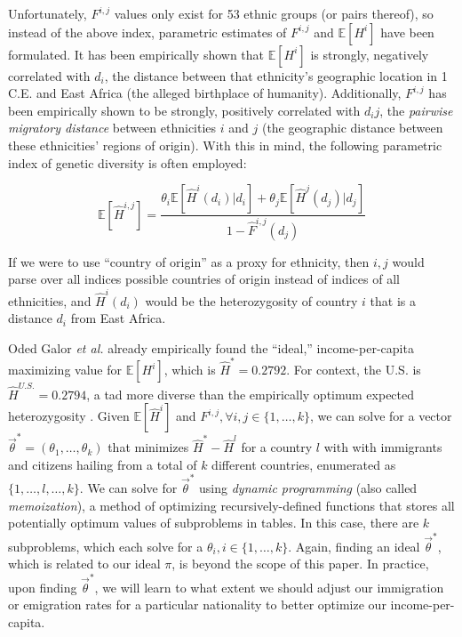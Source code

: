 \documentclass{article}
\begin{document}
Unfortunately, $F^{i,j}$ values only exist for 53 ethnic groups (or pairs thereof), so instead of the above index, parametric estimates of $F^{i,j}$ and $\mathbb{E}[H^i]$ have been formulated. It has been empirically shown that $\mathbb{E}[H^i]$ is strongly, negatively correlated with $d_i$, the distance between that ethnicity's geographic location in 1 C.E. and East Africa (the alleged birthplace of humanity). Additionally, $F^{i,j}$ has been empirically shown to be strongly, positively correlated with $d_ij$, the \textit{pairwise migratory distance} between ethnicities $i$ and $j$ (the geographic distance between these ethnicities' regions of origin). With this in mind, the following parametric index of genetic diversity is often employed:

\[
\mathbb{E}[\hat{H}^{i,j}] = \frac{\theta_i\mathbb{E}[\hat{H}^i(d_i)|d_i] + \theta_j\mathbb{E}[\hat{H}^j(d_j)|d_j]}{1-\hat{F}^{i,j}(d_j)}
\]

If we were to use ``country of origin'' as a proxy for ethnicity, then $i,j$ would parse over all indices possible countries of origin instead of indices of all ethnicities, and $\hat{H}^i(d_i)$ would be the heterozygosity of country $i$ that is a distance $d_i$ from East Africa.

Oded Galor \textit{et al.} \cite{OdedSlides} already empirically found the ``ideal,'' income-per-capita maximizing value for $\mathbb{E}[H^i]$, which is $\hat{H}^* = 0.2792$. For context, the U.S. is $\hat{H}^{U.S.} = 0.2794$, a tad more diverse than the empirically optimum expected heterozygosity \cite{OdedSlides}. Given $\mathbb{E}[\hat{H}^{i}]$ and $F^{i,j}, \forall i,j \in \{1, \dots, k\}$, we can solve for a vector $\vec{\theta}^* = (\theta_1, \dots, \theta_k)$ that minimizes $\hat{H}^* - \hat{H}^{l}$ for a country $l$ with with immigrants and citizens hailing from a total of $k$ different countries, enumerated as $\{1, \dots, l, \dots, k\}$. We can solve for $\vec{\theta}^*$ using \textit{dynamic programming} (also called \textit{memoization}), a method of optimizing recursively-defined functions that stores all potentially optimum values of subproblems in tables. In this case, there are $k$ subproblems, which each solve for a $\theta_i, i \in \{1, \dots, k\}$. Again, finding an ideal $\vec{\theta}^*$, which is related to our ideal $\pi$, is beyond the scope of this paper. In practice, upon finding $\vec{\theta}^*$, we will learn to what extent we should adjust our immigration or emigration rates for a particular nationality to better optimize our income-per-capita.
\end{document}
